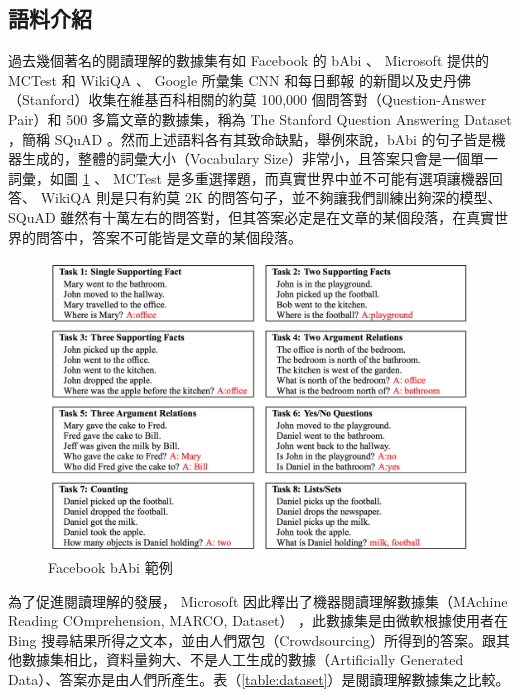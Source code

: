\subsection{語料介紹}
過去幾個著名的閱讀理解的數據集有如 Facebook 的 bAbi \cite{weston2015towards}  、 Microsoft 提供的 MCTest \cite{richardson2013mctest} 和 WikiQA \cite{yang2015wikiqa} 、 Google 所彙集 CNN 和每日郵報 \cite{hermann2015teaching} 的新聞以及史丹佛（Stanford）收集在維基百科相關的約莫 100,000 個問答對（Question-Answer Pair）和 500 多篇文章的數據集，稱為 The Stanford Question Answering Dataset ，簡稱 SQuAD \cite{rajpurkar2016squad} 。然而上述語料各有其致命缺點，舉例來說，bAbi 的句子皆是機器生成的，整體的詞彙大小（Vocabulary Size）非常小，且答案只會是一個單一詞彙，如圖 \ref{fig:babi} 、 MCTest 是多重選擇題，而真實世界中並不可能有選項讓機器回答、 WikiQA 則是只有約莫 2K 的問答句子，並不夠讓我們訓練出夠深的模型、SQuAD 雖然有十萬左右的問答對，但其答案必定是在文章的某個段落，在真實世界的問答中，答案不可能皆是文章的某個段落。

\begin{figure}[h]
    \includegraphics[scale=0.6]{images/chap2_babi.png}
    \caption{Facebook bAbi 範例}\label{fig:babi}
\end{figure}

為了促進閱讀理解的發展， Microsoft 因此釋出了機器閱讀理解數據集（MAchine Reading COmprehension, MARCO, Dataset）\cite{nguyen2016ms} ，此數據集是由微軟根據使用者在 Bing 搜尋結果所得之文本，並由人們眾包（Crowdsourcing）所得到的答案。跟其他數據集相比，資料量夠大、不是人工生成的數據（Artificially Generated Data）、答案亦是由人們所產生。表（\ref{table:dataset}）是閱讀理解數據集之比較。


